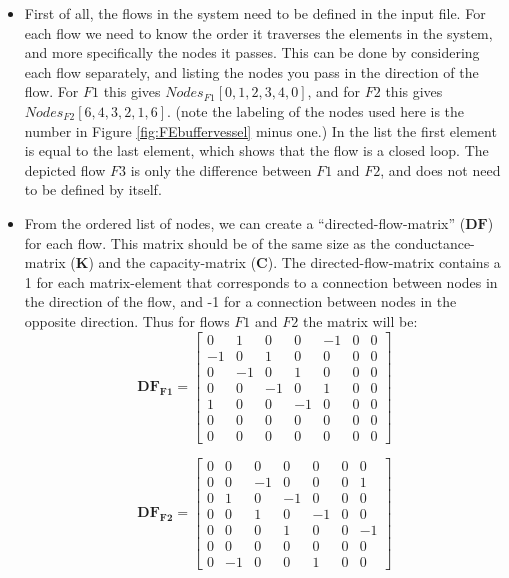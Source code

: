 \begin{itemize}
	\item First of all, the flows in the system need to be defined in the input file. For each flow we need to know the order it traverses the elements in the system, and more specifically the nodes it passes. This can be done by considering each flow separately, and listing the nodes you pass in the direction of the flow.
	For $F1$ this gives $Nodes_{F1}\left[0, 1, 2, 3, 4, 0 \right]$, and for $F2$ this gives $Nodes_{F2}\left[6,4,3,2,1,6\right]$. (note the labeling of the nodes used here is the number in Figure \ref{fig:FEbuffervessel} minus one.) In the list the first element is equal to the last element, which shows that the flow is a closed loop. The depicted flow $F3$ is only the difference between $F1$ and $F2$, and does not need to be defined by itself. 
	\item From the ordered list of nodes, we can create a "`directed-flow-matrix"' ($\mathbf{DF}$) for each flow. This matrix should be of the same size as the conductance-matrix ($\mathbf{K}$) and the capacity-matrix ($\mathbf{C}$).  The directed-flow-matrix contains a 1 for each matrix-element that corresponds to a connection between nodes in the direction of the flow, and -1 for a connection between nodes in the opposite direction. Thus for flows $F1$ and $F2$ the matrix will be:
	\begin{equation}
		\mathbf{DF_{F1}} = \begin{bmatrix}
							0 & 1 & 0 & 0 & -1& 0 & 0 \\
							-1& 0 & 1 & 0 & 0 & 0 & 0 \\
							0 & -1& 0 & 1 & 0 & 0 & 0 \\
							0 & 0 & -1& 0 & 1 & 0 & 0 \\
							1 & 0 & 0 & -1& 0 & 0 & 0 \\
							0 & 0 & 0 & 0 & 0 & 0 & 0 \\
							0 & 0 & 0 & 0 & 0 & 0 & 0 
							\end{bmatrix}
	\label{eq:DFflow1}
	\end{equation}
	
	\begin{equation}
		\mathbf{DF_{F2}} = \begin{bmatrix}
							0 & 0 & 0 & 0 & 0 & 0 & 0 \\
							0 & 0 & -1& 0 & 0 & 0 & 1 \\
							0 & 1 & 0 & -1& 0 & 0 & 0 \\
							0 & 0 & 1 & 0 & -1& 0 & 0 \\
							0 & 0 & 0 & 1 & 0 & 0 & -1 \\
							0 & 0 & 0 & 0 & 0 & 0 & 0 \\
							0 & -1& 0 & 0 & 1 & 0 & 0 
							\end{bmatrix}
	\label{eq:DFflow1}
	\end{equation}
	

\end{itemize}
